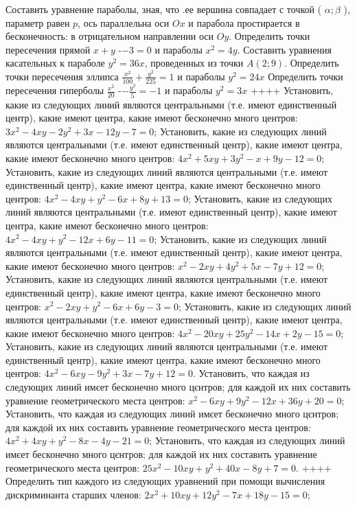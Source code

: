 Составить уравнение параболы, зная, что .ее вершина совпадает с точкой ( $\alpha ; \beta$ ), параметр равен $p$, ось параллельна оси $O x$ и парабола простирается в бесконечность: в отрицательном направлении оси $O y$.
Определить точки пересечения прямой $x+y$ -$-3=0$ и параболы $x^2=4 y$.
Составить уравнения касательных к параболе $y^2=36 x$, проведенных из точки $A(2 ; 9)$.
Определить точки пересечения эллипса $\frac{x^2}{100}+\frac{y^2}{225}=1$ и параболы $y^2=24 x$
Определить точки пересечения гиперболы $\frac{x^2}{20}$ -$-\frac{y^2}{5}=-1$ и параболы $y^2=3 x$
++++
Установить, какие из следующих линий являются центральными (т.е. имеют единственный центр), какие имеют центра, какие имеют бесконечно много центров: $3 x^2-4 x y-2 y^2+3 x-12 y-7=0$;
Установить, какие из следующих линий являются центральными (т.е. имеют единственный центр), какие имеют центра, какие имеют бесконечно много центров: $4 x^2+5 x y+3 y^2-x+9 y-12=0$;
Установить, какие из следующих линий являются центральными (т.е. имеют единственный центр), какие имеют центра, какие имеют бесконечно много центров: $4 x^2-4 x y+y^2-6 x+8 y+13=0$;
Установить, какие из следующих линий являются центральными (т.е. имеют единственный центр), какие имеют центра, какие имеют бесконечно много центров: $4 x^2-4 x y+y^2-12 x+6 y-11=0$;
Установить, какие из следующих линий являются центральными (т.е. имеют единственный центр), какие имеют центра, какие имеют бесконечно много центров: $x^2-2 x y+4 y^2+5 x-7 y+12=0$;
Установить, какие из следующих линий являются центральными (т.е. имеют единственный центр), какие имеют центра, какие имеют бесконечно много центров: $x^2-2 x y+y^2-6 x+6 y-3=0$;
Установить, какие из следующих линий являются центральными (т.е. имеют единственный центр), какие имеют центра, какие имеют бесконечно много центров: $4 x^2-20 x y+25 y^2-14 x+2 y-15=0$;
Установить, какие из следующих линий являются центральными (т.е. имеют единственный центр), какие имеют центра, какие имеют бесконечно много центров: $4 x^2-6 x y-9 y^2+3 x-7 y+12=0$.
Установить, что каждая из следующих линий имєет бесконечно много цєнтров; для каждой их них составить уравнение геометрического места центров: $x^2-6 x y+9 y^2-12 x+36 y+20=0$;
Установить, что каждая из следующих линий имєет бесконечно много цєнтров; для каждой их них составить уравнение геометрического места центров: $4 x^2+4 x y+y^2-8 x-4 y-21=0$;
Установить, что каждая из следующих линий имєет бесконечно много цєнтров; для каждой их них составить уравнение геометрического места центров: $25 x^2-10 x y+y^2+40 x-8 y+7=0$.
++++
Определить тип каждого из следующих уравнений при помощи вычисления дискриминанта старших членов: $2 x^2+10 x y+12 y^2-7 x+18 y-15=0$;
